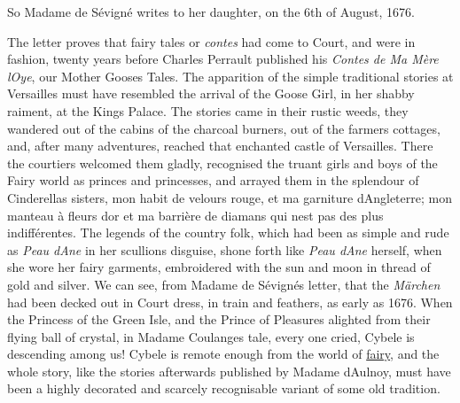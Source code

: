 \documentclass[14pt,a4paper]{memoir}
\newcommand{\ul}[1]{\uline{#1}}
\begin{document}
So Madame de Sévigné writes to her daughter, on the 6th of August, 1676.

The letter proves that fairy tales or \emph{contes} had come to Court,
and were in fashion, twenty years before Charles Perrault published his
\emph{Contes de Ma Mère l\textquotesingle Oye}, our
\textquotesingle Mother Goose\textquotesingle s Tales.\textquotesingle{}
The apparition of the simple traditional stories at Versailles must have
resembled the arrival of the Goose Girl, in her shabby raiment, at the
King\textquotesingle s
Palace.
The stories came in their rustic weeds, they wandered out of the cabins
of the charcoal burners, out of the farmers\textquotesingle{} cottages,
and, after many adventures, reached that enchanted castle of Versailles.
There the courtiers welcomed them gladly, recognised the truant girls
and boys of the Fairy world as princes and princesses, and arrayed them
in the splendour of Cinderella\textquotesingle s sisters,
\textquotesingle mon habit de velours rouge, et ma garniture
d\textquotesingle Angleterre; mon manteau à fleurs d\textquotesingle or
et ma barrière de diamans qui n\textquotesingle est pas des plus
indifférentes.\textquotesingle{} The legends of the country folk, which
had been as simple and rude as \emph{Peau d\textquotesingle Ane} in her
scullion\textquotesingle s disguise, shone forth like \emph{Peau
d\textquotesingle Ane} herself, when she wore her fairy garments,
embroidered with the sun and moon in thread of gold and silver. We can
see, from Madame de Sévigné\textquotesingle s letter, that the
\emph{Märchen} had been decked out in Court dress, in train and
feathers, as early as 1676. When the Princess of the Green Isle, and the
Prince of Pleasures alighted from their flying ball of crystal, in
Madame Coulanges\textquotesingle{} tale, every one cried,
\textquotesingle Cybele is descending among us!\textquotesingle{} Cybele
is remote enough from the world of \ul{fairy}, and the whole story, like
the stories afterwards published by Madame d\textquotesingle Aulnoy,
must have been a highly decorated and scarcely recognisable variant of
some old tradition.
\end{document}
